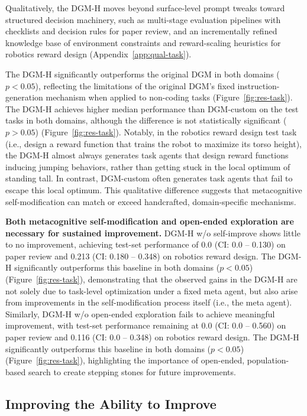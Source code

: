 Qualitatively, the DGM-H moves beyond surface-level prompt tweaks toward structured decision machinery, such as multi-stage evaluation pipelines with checklists and decision rules for paper review, and an incrementally refined knowledge base of environment constraints and reward-scaling heuristics for robotics reward design (Appendix~\ref{app:qual-task}).

The DGM-H significantly outperforms the original DGM in both domains ($p < 0.05$), reflecting the limitations of the original DGM's fixed instruction-generation mechanism when applied to non-coding tasks (Figure~\ref{fig:res-task}). The DGM-H achieves higher median performance than DGM-custom on the test tasks in both domains, although the difference is not statistically significant ($p > 0.05$) (Figure~\ref{fig:res-task}). Notably, in the robotics reward design test task (i.e., design a reward function that trains the robot to maximize its torso height), the DGM-H almost always generates task agents that design reward functions inducing jumping behaviors, rather than getting stuck in the local optimum of standing tall. In contrast, DGM-custom often generates task agents that fail to escape this local optimum. This qualitative difference suggests that metacognitive self-modification can match or exceed handcrafted, domain-specific mechanisms.

\textbf{Both metacognitive self-modification and open-ended exploration are necessary for sustained improvement.}
DGM-H w/o self-improve \citep{huautomated} shows little to no improvement, achieving test-set performance of 0.0 (CI: 0.0 -- 0.130) on paper review and 0.213 (CI: 0.180 -- 0.348) on robotics reward design. The DGM-H significantly outperforms this baseline in both domains ($p < 0.05$) (Figure~\ref{fig:res-task}), demonstrating that the observed gains in the DGM-H are not solely due to task-level optimization under a fixed meta agent, but also arise from improvements in the self-modification process itself (i.e., the meta agent).
Similarly, DGM-H w/o open-ended exploration fails to achieve meaningful improvement, with test-set performance remaining at 0.0 (CI: 0.0 -- 0.560) on paper review and 0.116 (CI: 0.0 -- 0.348) on robotics reward design. The DGM-H significantly outperforms this baseline in both domains ($p < 0.05$) (Figure~\ref{fig:res-task}), highlighting the importance of open-ended, population-based search to create stepping stones for future improvements.

\subsection{Improving the Ability to Improve}
\label{sec:results-meta}

